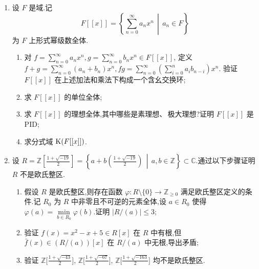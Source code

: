 \begin{enumerate}
\begin{proof}
\begin{enumerate}[label=(\arabic*)]
    如果$\varphi(d)=1$，即$d=\pm1$，存在$\alpha,\beta\in\Z[\sqrt{-5}]$使得$2\alpha+(1+\sqrt{-5})\beta=1$，
    两边同乘$1-\sqrt{-5}$得到$2[(1-\sqrt{-5})\alpha+3\beta]=1-\sqrt{-5}$，可是$2$不整除$1-\sqrt{-5}$；
    并且$\varphi(d)=2$也不可能，因为$a^2+5b^2=2$无整数解。
    \item 假设$(2,x)$是主理想$(d)$，则$d$整除$2$和$x$，只能是$\pm1$。
    那么存在$f(x),g(x)\in\Z[x]$使得$2f(x)+xg(x)=1$，左边的常数项是偶数而右边是奇数。\qedhere
    \end{enumerate}
\end{proof}

\item 设 $ F $ 是域.记
\[ F[[x]] = \left\{ \sum_{n=0}^{\infty} a_n x^n \,\middle|\, a_n \in F \right\} \]
为 $ F $ 上形式幂级数全体.
\begin{enumerate}[label=(\arabic*)]
    \item 对 $ f = \sum\limits_{n=0}^{\infty} a_n x^n, g = \sum\limits_{n=0}^{\infty} b_n x^n \in F[[x]] $,
    定义 $ f + g = \sum\limits_{n=0}^{\infty} (a_n + b_n)x^n, fg = \sum\limits_{n=0}^{\infty} \left( \sum\limits_{i=0}^{n} a_i b_{n-i} \right) x^n $.
    验证 $ F[[x]] $ 在上述加法和乘法下构成一个含幺交换环;
    \item 求 $ F[[x]] $ 的单位全体;
    \item 求 $ F[[x]] $ 的理想全体,其中哪些是素理想、\,极大理想?证明 $ F[[x]] $ 是PID;
    \item 求分式域 $ {\rm K}(F[[x]]) $.
\end{enumerate}

\item 设 $ R = \mathbb{Z} \left[ \frac{1 + \sqrt{-19}}{2} \right] = \left\{ a + b \left( \frac{1 + \sqrt{-19}}{2} \right) \,\middle|\, a, b \in \mathbb{Z} \right\} \subset \mathbb{C} $.通过以下步骤证明 $ R $ 不是欧氏整区.
\begin{enumerate}[label=(\arabic*)]
    \item 假设 $ R $ 是欧氏整区,则存在函数 $ \varphi : R \setminus \{0\} \to \mathbb{Z}_{\geqslant 0} $ 满足欧氏整区定义的条件.记 $ R_0 $ 为 $ R $ 中非零且不可逆的元素全体,设 $ a \in R_0 $ 使得
    $\varphi(a) = \min\limits_{b \in R_0} \varphi(b)$.证明 $|R/(a)| \leqslant 3$;
    \item 验证 $ f(x) = x^2 - x + 5 \in R[x] $ 在 $ R $ 中有根,但 $ \bar{f}(x) \in (R/(a))[x] $ 在 $ R/(a) $ 中无根,导出矛盾;
    \item 验证 $ \mathbb{Z} \Big[ \frac{1 + \sqrt{-43}}{2} \Big],\,\mathbb{Z} \Big[ \frac{1 + \sqrt{-67}}{2} \Big],\,\mathbb{Z} \Big[ \frac{1 + \sqrt{-163}}{2} \Big] $ 均不是欧氏整区.
\end{enumerate}


\end{enumerate}
